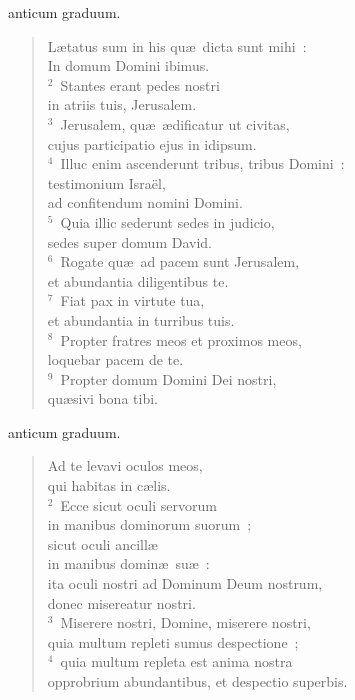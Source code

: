 \bchapter[Psalm]
anticum graduum. \begin{verse}L\ae tatus sum in his qu\ae\ dicta sunt mihi~:\\ In domum Domini ibimus.\\
${}^{2}$~Stantes erant pedes nostri\\ in atriis tuis, Jerusalem.\\
${}^{3}$~Jerusalem, qu\ae\ \ae dificatur ut civitas,\\ cujus participatio ejus in idipsum.\\
${}^{4}$~Illuc enim ascenderunt tribus, tribus Domini~:\\ testimonium Isra\"el,\\ ad confitendum nomini Domini.\\
${}^{5}$~Quia illic sederunt sedes in judicio,\\ sedes super domum David.\\
${}^{6}$~Rogate qu\ae\ ad pacem sunt Jerusalem,\\ et abundantia diligentibus te.\\
${}^{7}$~Fiat pax in virtute tua,\\ et abundantia in turribus tuis.\\
${}^{8}$~Propter fratres meos et proximos meos,\\ loquebar pacem de te.\\
${}^{9}$~Propter domum Domini Dei nostri,\\ qu\ae sivi bona tibi.\end{verse}



\bchapter[Psalm]
anticum graduum. \begin{verse}Ad te levavi oculos meos,\\ qui habitas in c\ae lis.\\
${}^{2}$~Ecce sicut oculi servorum\\ in manibus dominorum suorum~;\\ sicut oculi ancill\ae \\ in manibus domin\ae\ su\ae~:\\ ita oculi nostri ad Dominum Deum nostrum,\\ donec misereatur nostri.\\
${}^{3}$~Miserere nostri, Domine, miserere nostri,\\ quia multum repleti sumus despectione~;\\
${}^{4}$~quia multum repleta est anima nostra\\ opprobrium abundantibus, et despectio superbis.\end{verse}



